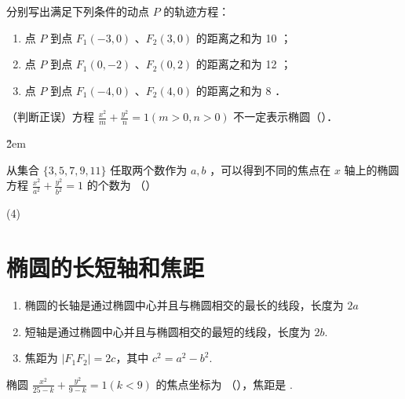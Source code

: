 \begin{example}
    分别写出满足下列条件的动点 $P$ 的轨迹方程：
    \begin{enumerate}
        \item 点 $P$ 到点 $F_1(-3,0)$ 、$F_2(3,0)$ 的距离之和为 10 ；
        \item 点 $P$ 到点 $F_1(0,-2)$ 、$F_2(0,2)$ 的距离之和为 12 ；
        \item 点 $P$ 到点 $F_1(-4,0)$ 、$F_2(4,0)$ 的距离之和为 8 ．
    \end{enumerate}
\end{example}

\vspace{10em}

\begin{example}
    （判断正误）方程 $\frac{x^2}{m}+\frac{y^2}{n}=1(m>0, n>0)$ 不一定表示椭圆（\quad）．
\end{example}

\v{2em}

\begin{example}
    从集合 $\{3,5,7,9,11\}$ 任取两个数作为 $a, b$ ，可以得到不同的焦点在 $x$ 轴上的椭圆方程 $\frac{x^2}{a^2}+\frac{y^2}{b^2}=1$ 的个数为 （\qquad）
    \begin{tasks}(4)
    \end{tasks}
\end{example}

\vspace{4em}

\section{椭圆的长短轴和焦距}

\begin{definition}
    \begin{enumerate}
        \item 椭圆的长轴是通过椭圆中心并且与椭圆相交的最长的线段，长度为 $2a$
        \item 短轴是通过椭圆中心并且与椭圆相交的最短的线段，长度为 $2b$.
        \item 焦距为 $|F_1F_2|=2c$，其中 $c^2=a^2-b^2$.
    \end{enumerate}
\end{definition}

\begin{example}
    椭圆 $\frac{x^2}{25-k}+\frac{y^2}{9-k}=1(k<9)$ 的焦点坐标为 （\qquad），焦距是 \underline{\qquad}.
\end{example}

